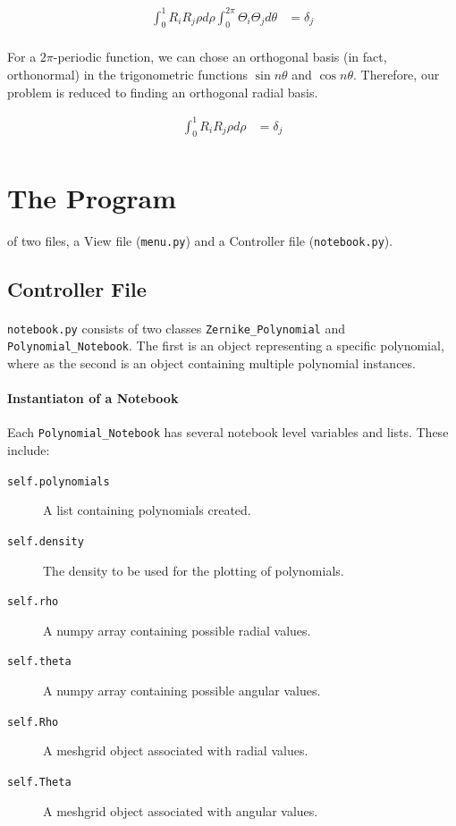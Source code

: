 \documentclass{tufte-handout}
\begin{document}
\begin{align*}
\int_0^1R_iR_j\rho d\rho\int_0^{2\pi} \Theta_i\Theta_jd\theta  &= \delta_j\\
\end{align*}

For a $2\pi$-periodic function, we can chose an orthogonal basis (in fact,
orthonormal) in the trigonometric functions $\sin n\theta$ and $\cos n\theta$.
Therefore, our problem is reduced to finding an orthogonal radial basis.

\begin{align*}
\int_0^1R_iR_j\rho d\rho &= \delta_j\\
\end{align*}

\pagebreak

\section{The Program}\label{sec:program}

 of two files, a View file (\Verb|menu.py|) and a Controller file (\Verb|notebook.py|).


\subsection{Controller File}
\paragraph{}\Verb|notebook.py| consists of two classes \Verb|Zernike_Polynomial| and \Verb|Polynomial_Notebook|.  The first is an object representing a specific polynomial, where as the second is an object containing multiple polynomial instances.

\paragraph{Instantiaton of a Notebook}
Each \Verb|Polynomial_Notebook| has several notebook level variables and lists. These include:

\begin{description}
\item[\Verb|self.polynomials|] A list containing polynomials created.
\item[\Verb|self.density|] The density to be used for the plotting of polynomials.
\item[\Verb|self.rho|] A numpy array containing possible radial values.
\item[\Verb|self.theta|] A numpy array containing possible angular values.
\item[\Verb|self.Rho|] A meshgrid object associated with radial values.
\item[\Verb|self.Theta|] A meshgrid object associated with angular values. 
\end{description}
\end{document}
